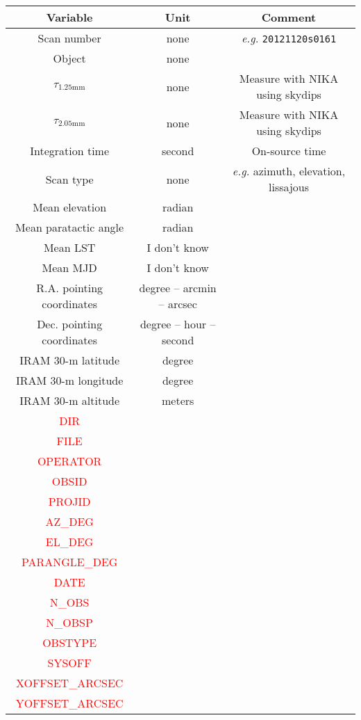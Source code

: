 \documentclass[a4paper,10pt]{article}
\begin{document}
\begin{table}[ht]
	\begin{center}
	\begin{tabular}{|c|c|c|}
         \hline
	Variable & Unit & Comment \\
	\hline
	Scan number & none & {\it e.g.} {\tt 20121120s0161} \\
	Object & none & \\
	$\tau_{\mathrm{1.25 mm}}$ & none & Measure with NIKA using skydips \\
	$\tau_{\mathrm{2.05 mm}}$ & none & Measure with NIKA using skydips \\
	Integration time & second & On-source time \\
	Scan type & none & {\it e.g.} azimuth, elevation, lissajous \\
	Mean elevation & radian & \\
	Mean paratactic angle & radian & \\
	Mean LST & I don't know & \\
	Mean MJD  & I don't know & \\
	R.A. pointing coordinates & degree -- arcmin -- arcsec & \\
	Dec. pointing coordinates & degree -- hour -- second & \\
	IRAM 30-m latitude & degree & \\
	IRAM 30-m longitude & degree & \\
	IRAM 30-m altitude & meters & \\
	 \textcolor{red}{DIR} & & \\ 
	 \textcolor{red}{FILE} & & \\
	\textcolor{red}{OPERATOR} & &  \\
	\textcolor{red}{OBSID} & &  \\
	\textcolor{red}{PROJID} & &  \\
	\textcolor{red}{AZ\_DEG} & &  \\
	\textcolor{red}{EL\_DEG} & &  \\
	\textcolor{red}{PARANGLE\_DEG} & &  \\
	\textcolor{red}{DATE} & &  \\
	\textcolor{red}{N\_OBS} & &  \\
	\textcolor{red}{N\_OBSP} & &  \\
	\textcolor{red}{OBSTYPE} & &  \\
	\textcolor{red}{SYSOFF} & &  \\
	\textcolor{red}{XOFFSET\_ARCSEC} & &  \\
	\textcolor{red}{YOFFSET\_ARCSEC} & &  \\

\end{tabular}
\end{center}
\end{table}
\end{document}
